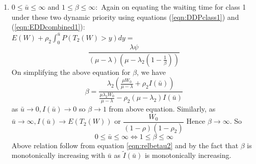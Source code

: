 \documentclass[letterpaper, 10 pt, conference]{ieeeconf}  %
\newenvironment{mylemma}[1]{{ \textbf{\textit{Proof of Lemma #1:}}}}{}
\begin{document}
\begin{appendices}
\begin{mylemma}{\ref{clm:equivalenceDDPnEDD}}
\begin{enumerate}
as $\bar{u} \rightarrow 0, \tilde{I}(\bar{u}) \rightarrow 0$ so $\beta \rightarrow 1$ from above equation. Similarly, as $\bar{u} \rightarrow -\infty, \tilde{I}(\bar{u}) \rightarrow E(T_1(W))$ or $\dfrac{W_0}{(1-\rho)(1-\rho_1)}$ Hence $\beta \rightarrow 0$. So
$$-\infty \le \bar{u} \le 0 \Leftrightarrow 0 \le \beta \le 1$$ 
Above relation follows from equation (\ref{eqn:relbetau1}) and by the fact that $\beta$ is monotonically increasing with $\bar{u}$ as $\tilde{I}(\bar{u})$ is monotonically decreasing. 
\item $0 \le \bar{u} \le \infty$ and $1 \le \beta \le \infty:$ Again on equating the waiting time for class 1 under these two dynamic priority using equations (\ref{eqn:DDPclass1}) and (\ref{eqn:EDDcombined1}):\\
$E(W) + \rho_2\int_0^{\bar{u}}P(T_2(W)> y)dy =$
\begin{equation}
 \frac{\lambda \psi}{(\mu -\lambda)(\mu - \lambda_2(1-\frac{1}{\beta}))}
\end{equation} 
On simplifying the above equation for $\beta$, we have
\begin{equation}\label{eqn:relbetau2}
\beta  = \frac{\lambda_2\left( \frac{\mu W_0}{\mu-\lambda} + \rho_2 I(\bar{u})\right)}{\frac{\mu \lambda_2 W_0}{\mu-\lambda}	-\rho_2(\mu-\lambda_2)I(\bar{u})}
\end{equation}
as $\bar{u} \rightarrow 0, I(\bar{u}) \rightarrow 0$ so $\beta \rightarrow 1$ from above equation. Similarly, as $\bar{u} \rightarrow \infty, {I}(\bar{u}) \rightarrow E(T_2(W))$ or $\dfrac{W_0}{(1-\rho)(1-\rho_2)}$ Hence $\beta \rightarrow \infty$. So
$$0 \le \bar{u} \le \infty \Leftrightarrow 1 \le \beta \le \infty$$ 
Above relation follow from equation \ref{eqn:relbetau2} and by the fact that $\beta$ is monotonically increasing with $\bar{u}$ as $\tilde{I}(\bar{u})$ is monotonically increasing. 
\end{enumerate}
\end{mylemma}


\end{appendices}
\end{document}
